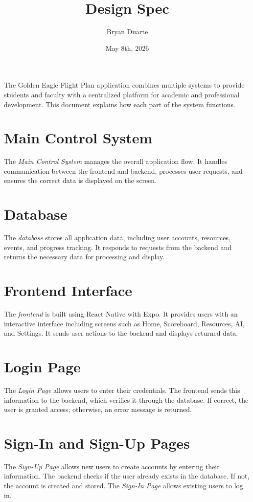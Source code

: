 \documentclass{article}
\begin{document}
\title{Design Spec}
\author{Bryan Duarte}
\date{May 8th, 2026}

\maketitle

\fancyhf{}
\fancyfoot[C]{\thepage}

The Golden Eagle Flight Plan application combines multiple systems to provide students and faculty with a centralized platform for academic and professional development. This document explains how each part of the system functions.

\section{Main Control System}
The \textit{Main Control System} manages the overall application flow. It handles communication between the frontend and backend, processes user requests, and ensures the correct data is displayed on the screen.

\section{Database}
The \textit{database} stores all application data, including user accounts, resources, events, and progress tracking. It responds to requests from the backend and returns the necessary data for processing and display.

\section{Frontend Interface}
The \textit{frontend} is built using React Native with Expo. It provides users with an interactive interface including screens such as Home, Scoreboard, Resources, AI, and Settings. It sends user actions to the backend and displays returned data.

\section{Login Page}
The \textit{Login Page} allows users to enter their credentials. The frontend sends this information to the backend, which verifies it through the database. If correct, the user is granted access; otherwise, an error message is returned.

\section{Sign-In and Sign-Up Pages}
The \textit{Sign-Up Page} allows new users to create accounts by entering their information. The backend checks if the user already exists in the database. If not, the account is created and stored. The \textit{Sign-In Page} allows existing users to log in.
\end{document}

